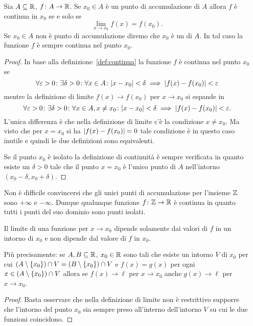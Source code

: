\begin{theorem}%
\mymark{***}%
  Sia $A\subseteq \mathbb R$, $f\colon A \to \mathbb R$. 
  Se $x_0\in A$ è un punto di accumulazione di $A$
  allora $f$ è continua in $x_0$ se e solo se
  \[
    \lim_{x\to x_0}f(x) = f(x_0).
  \]
  Se $x_0\in A$ non è punto di accumulazione diremo 
  che $x_0$ è un  di $A$.
  In tal caso la funzione $f$ è sempre continua nel punto $x_0$.
\end{theorem}
  
  \begin{proof}
  In base alla definizione~\ref{def:continua} la funzione $f$ è continua nel
  punto $x_0$ se
  \[
   \forall \varepsilon>0 \colon \exists \delta >0 \colon
   \forall x \in A\colon
   {\left|x-x_0\right|}<\delta \implies {\left|f(x)-f(x_0)\right|} < \varepsilon
  \]
  mentre la definizione di limite $f(x)\to f(x_0)$ per $x\to x_0$
  si espande in
  \[
  \forall \varepsilon>0 \colon \exists \delta>0\colon
  \forall x \in A, x\neq x_0\colon
  {\left|x-x_0\right|}<\delta \implies {\left|f(x)-f(x_0)\right|} < \varepsilon.
  \]
  L'unica differenza è che nella definizione di limite
  c'è la condizione $x\neq x_0$. Ma visto che per $x=x_0$
  si ha ${\left|f(x)-f(x_0)\right|}=0$ tale condizione è in questo caso 
  inutile e quindi le due definizioni sono equivalenti.

  Se il punto $x_0$ è isolato la definizione di continuità
  è sempre verificata in quanto esiste un $\delta>0$ 
  tale che il punto $x=x_0$ è l'unico punto di $A$ 
  nell'intorno $(x_0-\delta,x_0+\delta)$.
  \end{proof}

\begin{example}
  Non è difficile convincersi che gli unici punti di accumulazione 
  per l'insieme $\mathbb Z$ sono $+\infty$ e $-\infty$.
  Dunque qualunque funzione $f\colon \mathbb Z \to \mathbb R$ è continua in quanto 
  tutti i punti del suo dominio sono punti isolati.
\end{example}
  
\begin{theorem}
Il limite di una funzione per $x\to x_0$ dipende solamente dai valori di $f$
in un intorno di $x_0$ e non dipende dal valore di $f$ in $x_0$.

Più precisamente: se $A,B\subseteq \mathbb R$, $x_0\in \mathbb R$ sono tali che 
esiste un intorno $V$ di $x_0$ per cui 
$(A\setminus{\left\{ x_0 \right\}}) \cap  V = (B\setminus {\left\{ x_0 \right\}}) \cap V$ 
e $f(x)=g(x)$ per ogni $x\in(A\setminus{\left\{ x_0 \right\}}) \cap  V$ 
allora se $f(x)\to \ell$ per $x\to x_0$ anche $g(x)\to \ell$ 
per $x\to x_0$.
\end{theorem}
%
\begin{proof}
  Basta osservare che nella definizione di limite 
  non è restrittivo supporre che l'intorno del punto $x_0$ 
  sia sempre preso all'interno dell'intorno $V$ su cui 
  le due funzioni coincidono.
\end{proof}

